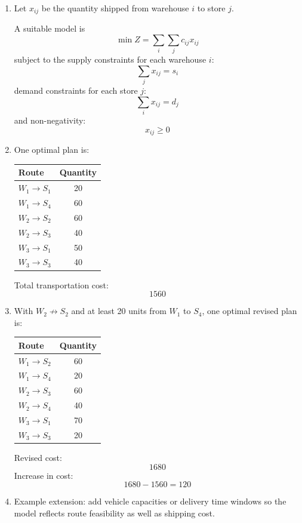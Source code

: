 \documentclass[11pt,a4paper]{article}
\begin{document}
\begin{enumerate}
\item Let $x_{ij}$ be the quantity shipped from warehouse $i$ to store $j$.

A suitable model is
\[
\min Z = \sum_i \sum_j c_{ij}x_{ij}
\]
subject to the supply constraints for each warehouse $i$:
\[
\sum_j x_{ij} = s_i
\]
demand constraints for each store $j$:
\[
\sum_i x_{ij} = d_j
\]
and non-negativity:
\[
x_{ij}\ge 0
\]

\item One optimal plan is:

\begin{center}
\begin{tabular}{lc}
\toprule
Route & Quantity \\
\midrule
$W_1 \to S_1$ & 20 \\
$W_1 \to S_4$ & 60 \\
$W_2 \to S_2$ & 60 \\
$W_2 \to S_3$ & 40 \\
$W_3 \to S_1$ & 50 \\
$W_3 \to S_3$ & 40 \\
\bottomrule
\end{tabular}
\end{center}

Total transportation cost:
\[
1560
\]

\item With $W_2 \not\to S_2$ and at least 20 units from $W_1$ to $S_4$, one optimal revised plan is:

\begin{center}
\begin{tabular}{lc}
\toprule
Route & Quantity \\
\midrule
$W_1 \to S_2$ & 60 \\
$W_1 \to S_4$ & 20 \\
$W_2 \to S_3$ & 60 \\
$W_2 \to S_4$ & 40 \\
$W_3 \to S_1$ & 70 \\
$W_3 \to S_3$ & 20 \\
\bottomrule
\end{tabular}
\end{center}

Revised cost:
\[
1680
\]
Increase in cost:
\[
1680-1560=120
\]

\item Example extension: add vehicle capacities or delivery time windows so the model reflects route feasibility as well as shipping cost.
\end{enumerate}
\end{document}
